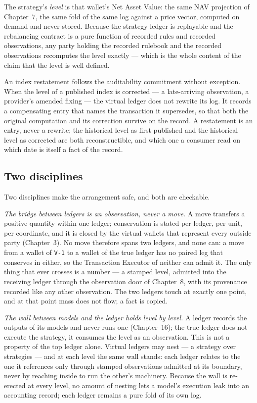 \documentclass[11pt,a4paper]{article}
\begin{document}
The strategy's \emph{level} is that wallet's Net Asset Value: the same NAV
projection of Chapter~7, the same fold of the same log against a price vector,
computed on demand and never stored. Because the strategy ledger is replayable
and the rebalancing contract is a pure function of recorded rules and recorded
observations, any party holding the recorded rulebook and the recorded
observations recomputes the level exactly --- which is the whole content of the
claim that the level is well defined.

An index restatement follows the auditability commitment without exception. When
the level of a published index is corrected --- a late-arriving observation, a
provider's amended fixing --- the virtual ledger does not rewrite its log. It
records a compensating entry that names the transaction it supersedes, so that
both the original computation and its correction survive on the record. A
restatement is an entry, never a rewrite; the historical level as first published
and the historical level as corrected are both reconstructible, and which one a
consumer read on which date is itself a fact of the record.

\subsection{Two disciplines}

Two disciplines make the arrangement safe, and both are checkable.

\emph{The bridge between ledgers is an observation, never a move.} A move
transfers a positive quantity within one ledger; conservation is stated per
ledger, per unit, per coordinate, and it is closed by the virtual wallets that
represent every outside party (Chapter~3). No move therefore spans two ledgers,
and none can: a move from a wallet of \texttt{V-1} to a wallet of the true ledger
has no paired leg that conserves in either, so the Transaction Executor of
neither can admit it. The only thing that ever crosses is a number --- a stamped
level, admitted into the receiving ledger through the observation door of
Chapter~8, with its provenance recorded like any other observation. The two
ledgers touch at exactly one point, and at that point mass does not flow; a fact
is copied.

\emph{The wall between models and the ledger holds level by level.} A ledger
records the outputs of its models and never runs one (Chapter~16); the true
ledger does not execute the strategy, it consumes the level as an observation.
This is not a property of the top ledger alone. Virtual ledgers may nest --- a
strategy over strategies --- and at each level the same wall stands: each ledger
relates to the one it references only through stamped observations admitted at
its boundary, never by reaching inside to run the other's machinery. Because the
wall is re-erected at every level, no amount of nesting lets a model's execution
leak into an accounting record; each ledger remains a pure fold of its own log.
\end{document}
